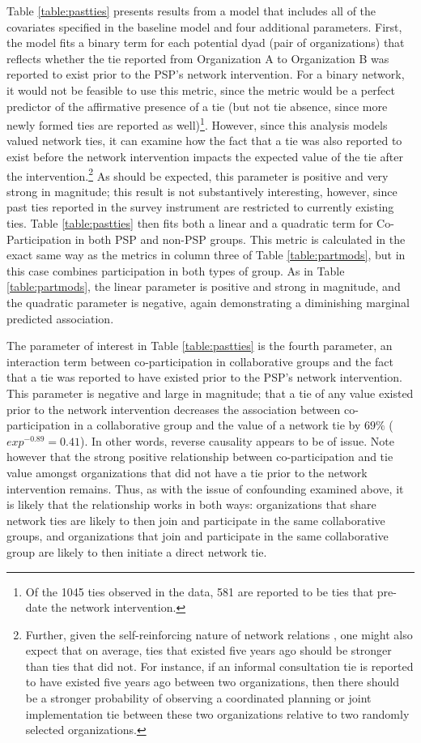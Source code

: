 \documentclass[12pt,a4paper,titlepage]{article}
\begin{document}
Table \ref{table:pastties} presents results from a model that includes all of the covariates specified in the baseline model and four additional parameters. First, the model fits a binary term for each potential dyad (pair of organizations) that reflects whether the tie reported from Organization A to Organization B was reported to exist prior to the PSP's network intervention. For a binary network, it would not be feasible to use this metric, since the metric would be a perfect predictor of the affirmative presence of a tie (but not tie absence, since more newly formed ties are reported as well)\footnote{Of the 1045 ties observed in the data, 581 are reported to be ties that pre-date the network intervention.}. However, since this analysis models valued network ties, it can examine how the fact that a tie was also reported to exist before the network intervention impacts the expected value of the tie after the intervention.\footnote{Further, given the self-reinforcing nature of network relations \parencite{ostrom2000, putnam2000}, one might also expect that on average, ties that existed five years ago should be stronger than ties that did not. For instance, if an informal consultation tie is reported to have existed five years ago between two organizations, then there should be a stronger probability of observing a coordinated planning or joint implementation tie between these two organizations relative to two randomly selected organizations.} As should be expected, this parameter is positive and very strong in magnitude; this result is not substantively interesting, however, since past ties reported in the survey instrument are restricted to currently existing ties. Table \ref{table:pastties} then fits both a linear and a quadratic term for Co-Participation in both PSP and non-PSP groups. This metric is calculated in the exact same way as the metrics in column three of Table \ref{table:partmods}, but in this case combines participation in both types of group. As in Table \ref{table:partmods}, the linear parameter is positive and strong in magnitude, and the quadratic parameter is negative, again demonstrating a diminishing marginal predicted association.

The parameter of interest in Table \ref{table:pastties} is the fourth parameter, an interaction term between co-participation in collaborative groups and the fact that a tie was reported to have existed prior to the PSP's network intervention. This parameter is negative and large in magnitude; that a tie of any value existed prior to the network intervention decreases the association between co-participation in a collaborative group and the value of a network tie by $69\%$ ($exp^{-0.89} = 0.41$). In other words, reverse causality appears to be of issue. Note however that the strong positive relationship between co-participation and tie value amongst organizations that did not have a tie prior to the network intervention remains. Thus, as with the issue of confounding examined above, it is likely that the relationship works in both ways: organizations that share network ties are likely to then join and participate in the same collaborative groups, and organizations that join and participate in the same collaborative group are likely to then initiate a direct network tie.
\end{document}
